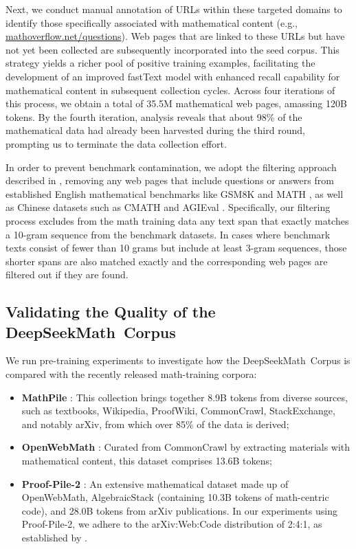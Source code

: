 \begin{itemize}[topsep=0pt]
Next, we conduct manual annotation of URLs within these targeted domains to identify those specifically associated with mathematical content (e.g., \url{mathoverflow.net/questions}). Web pages that are linked to these URLs but have not yet been collected are subsequently incorporated into the seed corpus. This strategy yields a richer pool of positive training examples, facilitating the development of an improved fastText model with enhanced recall capability for mathematical content in subsequent collection cycles. Across four iterations of this process, we obtain a total of 35.5M mathematical web pages, amassing 120B tokens. By the fourth iteration, analysis reveals that about 98\% of the mathematical data had already been harvested during the third round, prompting us to terminate the data collection effort.

In order to prevent benchmark contamination, we adopt the filtering approach described in \cite{deepseek-coder}, removing any web pages that include questions or answers from established English mathematical benchmarks like GSM8K \citep{gsm8k} and MATH \citep{MATH}, as well as Chinese datasets such as CMATH \citep{wei2023cmath} and AGIEval \citep{agieval}. Specifically, our filtering process excludes from the math training data any text span that exactly matches a 10-gram sequence from the benchmark datasets. In cases where benchmark texts consist of fewer than 10 grams but include at least 3-gram sequences, those shorter spans are also matched exactly and the corresponding web pages are filtered out if they are found.

\subsection{Validating the Quality of the DeepSeekMath~Corpus}

We run pre-training experiments to investigate how the DeepSeekMath~Corpus is compared with the recently released math-training corpora:

\begin{itemize}[topsep=0pt]
    \item \textbf{MathPile} \citep{mathpile}: This collection brings together 8.9B tokens from diverse sources, such as textbooks, Wikipedia, ProofWiki, CommonCrawl, StackExchange, and notably arXiv, from which over 85\% of the data is derived;
    \item \textbf{OpenWebMath} \citep{openwebmath}: Curated from CommonCrawl by extracting materials with mathematical content, this dataset comprises 13.6B tokens;
    \item \textbf{Proof-Pile-2} \citep{llemma}: An extensive mathematical dataset made up of OpenWebMath, AlgebraicStack (containing 10.3B tokens of math-centric code), and 28.0B tokens from arXiv publications. In our experiments using Proof-Pile-2, we adhere to the arXiv:Web:Code distribution of 2:4:1, as established by \cite{llemma}.
\end{itemize}


\end{itemize}
